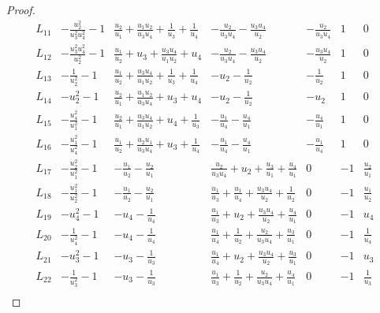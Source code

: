 \documentclass[a4paper,reqno]{amsart}
\numberwithin{equation}{section}
\numberwithin{equation}{section}
\begin{document}
\begin{proof}
\begin{table}[h]
\begin{equation*}
\begin{array}{c||c|c|c|c|c|c|}
        \hline
        L_{11} &-\frac{u_2^2}{u_3^2 u_4^2}-1    &\frac{u_2}{u_1}+\frac{u_1 u_2}{u_3 u_4}+\frac{1}{u_3}+\frac{1}{u_4}  & -\frac{u_2}{u_3 u_4}-\frac{u_3 u_4}{u_2} &-\frac{u_2}{u_3 u_4}  & 1   & 0           \\
        \hline
        L_{12}  & -\frac{u_3^2 u_4^2}{u_2^2}-1  &\frac{u_1}{u_2}+u_3+\frac{u_3 u_4}{u_1 u_2}+u_4  & -\frac{u_2}{u_3 u_4}-\frac{u_3 u_4}{u_2} & -\frac{u_3 u_4}{u_2} & 1   & 0          \\
        \hline
        L_{13}  & -\frac{1}{u_2^2}-1  &\frac{u_1}{u_2}+\frac{u_3 u_4}{u_1 u_2}+\frac{1}{u_3}+\frac{1}{u_4}  & -u_2-\frac{1}{u_2} & -\frac{1}{u_2}  & 1   & 0           \\
        \hline
        L_{14}  & -u_2^2-1  & \frac{u_2}{u_1}+\frac{u_1 u_2}{u_3 u_4}+u_3+u_4 & -u_2-\frac{1}{u_2} & -u_2  & 1   & 0           \\
        \hline
        L_{15}  & -\frac{u_4^2}{u_1^2}-1  & \frac{u_2}{u_1}+\frac{u_3 u_4}{u_1 u_2}+u_4+\frac{1}{u_3} & -\frac{u_1}{u_4}-\frac{u_4}{u_1} & -\frac{u_4}{u_1}  & 1   & 0           \\
        \hline
        L_{16}  & -\frac{u_1^2}{u_4^2}-1  & \frac{u_1}{u_2}+\frac{u_2 u_1}{u_3 u_4}+u_3+\frac{1}{u_4} & -\frac{u_1}{u_4}-\frac{u_4}{u_1}  & -\frac{u_1}{u_4} & 1   & 0          \\
        \hline \hline
        L_{17}  & -\frac{u_2^2}{u_1^2}-1  & -\frac{u_1}{u_2}-\frac{u_2}{u_1} &\frac{u_2}{u_3 u_4}+u_2+\frac{u_3}{u_1}+\frac{u_4}{u_1} & 0 & -1   & \frac{u_2}{u_1}         \\
        \hline
        L_{18}  &-\frac{u_1^2}{u_2^2}-1  & -\frac{u_1}{u_2}-\frac{u_2}{u_1} & \frac{u_1}{u_3}+\frac{u_1}{u_4}+\frac{u_3 u_4}{u_2}+\frac{1}{u_2}  & 0 & -1   & \frac{u_1}{u_2}         \\
        \hline
        L_{19}  & -u_4^2-1 & -u_4-\frac{1}{u_4} & \frac{u_1}{u_3}+u_2+\frac{u_3 u_4}{u_2}+\frac{u_4}{u_1} & 0 & -1   & u_4          \\
        \hline
        L_{20}  & -\frac{1}{u_4^2}-1  & -u_4-\frac{1}{u_4} & \frac{u_1}{u_4}+\frac{1}{u_2}+\frac{u_2}{u_3 u_4}+\frac{u_3}{u_1} & 0 & -1   & \frac{1}{u_4}          \\
        \hline
        L_{21}  & -u_3^2-1 & -u_3-\frac{1}{u_3} & \frac{u_1}{u_4}+u_2+\frac{u_3 u_4}{u_2}+\frac{u_3}{u_1} & 0 & -1   & u_3        \\
        \hline
        L_{22}  & -\frac{1}{u_3^2}-1   & -u_3-\frac{1}{u_3} & \frac{u_1}{u_3}+\frac{1}{u_2}+\frac{u_2}{u_3 u_4}+\frac{u_4}{u_1} & 0 & -1   & \frac{1}{u_3}          \\

\end{array}
\end{equation*}
\end{table}
\end{proof}
\end{document}
